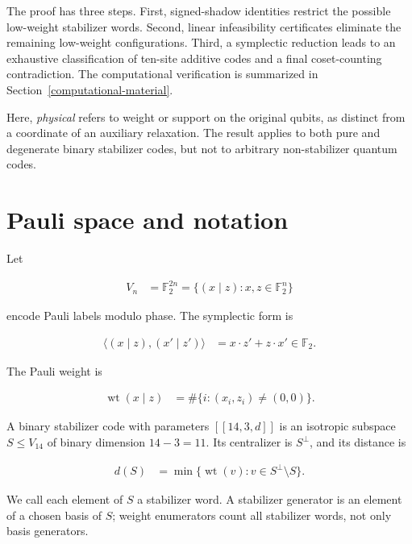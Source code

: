 \documentclass[11pt]{article}
\begin{document}
The proof has three steps. First, signed-shadow identities restrict the possible low-weight stabilizer words. Second, linear infeasibility certificates eliminate the remaining low-weight configurations. Third, a symplectic reduction leads to an exhaustive classification of ten-site additive codes and a final coset-counting contradiction. The computational verification is summarized in Section~\ref{computational-material}.

Here, \emph{physical} refers to weight or support on the original qubits, as distinct from a coordinate of an auxiliary relaxation. The result applies to both pure and degenerate binary stabilizer codes, but not to arbitrary non-stabilizer quantum codes.

\section{Pauli space and notation}\label{pauli-space-and-notation}

Let

\[
\begin{aligned}
V_{n} &=\mathbb{F}_{2}^{2n} = \{(x\mid z): x,z \in \mathbb{F}_{2}^{n}\}
\end{aligned}
\]

encode Pauli labels modulo phase. The symplectic form is

\[
\begin{aligned}
\langle  (x\mid z),(x'\mid z')  \rangle &=x \cdot z' + z \cdot x'  \in \mathbb{F}_{2}.
\end{aligned}
\]

The Pauli weight is

\[
\begin{aligned}
\operatorname{wt}(x\mid z) &=\#\{i : (x_{i},z_{i}) \ne  (0,0)\}.
\end{aligned}
\]

A binary stabilizer code with parameters \(\left[\!\left[14,3,d\right]\!\right]\) is an isotropic subspace \(S  \le  V_{14}\) of binary dimension \(14-3=11\). Its centralizer is \(S^\perp\), and its distance is

\[
\begin{aligned}
d(S) &=\min \{ \operatorname{wt}(v) : v \in S^\perp \setminus  S \}.
\end{aligned}
\]

We call each element of \(S\) a stabilizer word. A stabilizer generator is an element of a chosen basis of \(S\); weight enumerators count all stabilizer words, not only basis generators.
\end{document}
